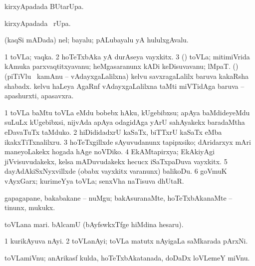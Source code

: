 {{{{{{\bentry
{} 
\gl{\kirx}
\expl{}
\bmng
{} kirxyApadada BUtarUpa. 
\emng
\eentry

\bentry
{} 
\gl{\kirx}
\expl{}
\bmng
{} kirxyApadada \BUkaq\ rUpa. 
\emng
\eentry

\bentry
{} 
\gl{\nA}
\expl{}
\bmng
(kaqSi mADada) nel; bayalu; pALubayalu yA hululxgAvalu. 
\emng
\eentry

\bentry
{} 
\gl{\nA}
\bmng
\bnum
\num{1} toVLa; vaqka. 
\num{2} hoTeTxbAka yA durAseya vayxkitx. 
\num{3} (\ashi) toVLa; mitimiVrida kAmuka parxvaqtitxyavanu; heMgasaranunx kADi keDisuvavanu; lMpaT. 
 (\saM) 
\banum
{} (piTiVlu \mo\ kamAnu -- vAdayxgaLalilxna) kelvu savxragaLalilx baruva kakaRsha shabadx. 
 kelvu haLeya AgaRnf vAdayxgaLalilxna taMti miVTidAga baruva -- apashurxti, apasavxra. 
\eanum
\numie
\enum
\emng

\noindent
\gl{\pagu}
\expl{}
\bmng
\bnum
\num{1}  toVLa baMtu toVLa eMdu bobebx hAku, kUgebibxsu; apAya baMdideyeMdu suLuLx kUgebibxsi, nijvAda apAya odagidAga yArU sahAyakekx baradaMtha eDavaTuTx taMduko. 
\num{2}  hiDididadxrU kaSaTx, biTTxrU kaSaTx eMba ikakxTiTxnalilxru. 
\num{3}  hoTeTxgillxde sAyuvudanunx tapipxsiko; dAridarxyx mAri maneyoLakekx hogada hAge noVDiko. 
\num{4}  EkAMtapirxya; EkAkiyAgi jiVvisuvudakekx, kelsa mADuvudakekx hecucx iSaTxpaDuva vayxkitx. 
\num{5}  dayAdAkiSxNyxvillxde (obabx vayxkitx \mo varanunx) balikoDu. 
\num{6}  goVmuK vAyxGarx; kurimeYya toVLa; senxVha naTisuva dhUtaR. 
\enum
\emng
\eentry

\bentry
{} 
\gl{\sakirx}
\expl{}
\bmng
gapagapane, bakabakane -- nuMgu; bakAsuranaMte, hoTeTxbAkanaMte -- tinunx, mukukx. 
\emng
\eentry

\bentry
{} 
\gl{\nA}
\expl{}
\bmng
\banum
{} toVLana mari. 
 bAlcamU (bAyfswkxTfge hiMdina hesaru). 
\eanum
\emng
\eentry

\bentry
{} 
\gl{\nA}
\expl{}
\bmng
\bnum
\num{1} kurikAyuva nAyi. 
\num{2} toVLanAyi; toVLa matutx nAyigaLa saMkarada pArxNi. 
\enum
\emng
\eentry

\bentry
{} 
\gl{\nA}
\expl{}
\bmng
toVLamiVnu; anArikasf kulda, hoTeTxbAkatanada, doDaDx loVLemeY miVnu. 
\emng
\eentry

}}}}}}
